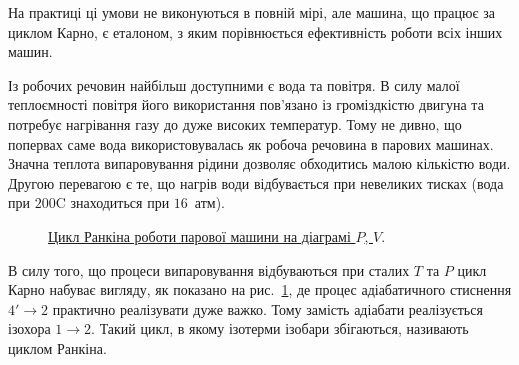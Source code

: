 На практиці ці умови не виконуються в повній мірі, але машина, що працює за циклом Карно, є еталоном,
з яким порівнюється ефективність роботи всіх інших машин.

Із робочих речовин найбільш доступними є вода та повітря. В силу малої теплоємності повітря
його використання пов'язано із громіздкістю двигуна та потребує нагрівання газу до дуже
високих температур. Тому не дивно, що попервах саме вода використовувалась як робоча
речовина в парових машинах. Значна теплота випаровування рідини дозволяє обходитись малою
кількістю води. Другою перевагою є те, що нагрів води відбувається при невеликих тисках (вода
при $200$\degree C знаходиться при $16$~атм).

\begin{figure}[h!]
	\centering
	
	\caption{\href{https://en.wikipedia.org/wiki/Steam_engine}{Цикл Ранкіна роботи парової машини на
діаграмі $P$, $V$}.}
	\label{pic:rankincycle}
\end{figure}

В силу того, що процеси випаровування відбуваються при сталих $T$ та $P$ цикл Карно набуває вигляду,
як показано на
рис.~\ref{pic:rankincycle}, де процес адіабатичного стиснення  $4' \to 2$ практично реалізувати дуже
важко.
Тому замість адіабати реалізується ізохора $1 \to 2$. Такий цикл, в якому ізотерми ізобари збігаються,
називають циклом Ранкіна.

